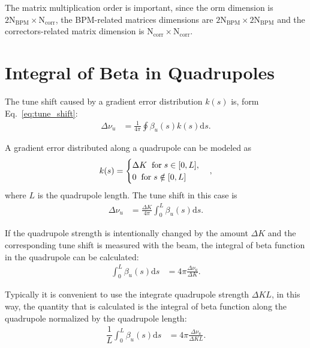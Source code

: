 The matrix multiplication order is important, since the \gls{orm} dimension is $2\mathrm{N}_{\mathrm{BPM}} \times \mathrm{N}_{\mathrm{corr}}$, the BPM-related matrices dimensions are $2\mathrm{N}_{\mathrm{BPM}} \times 2\mathrm{N}_{\mathrm{BPM}}$ and the correctors-related matrix dimension is $\mathrm{N}_{\mathrm{corr}} \times \mathrm{N}_{\mathrm{corr}}$. 

\chapter{Integral of Beta in Quadrupoles}
The tune shift caused by a gradient error distribution $k(s)$ is, form Eq.~\eqref{eq:tune_shift}:
\begin{align}
    \Delta\nu_u &= \frac{1}{4\pi} \oint \beta_u(s) k(s) \mathrm{d}s.
\end{align}

A gradient error distributed along a quadrupole can be modeled as
\begin{equation}
    k(s) = 
\begin{cases}
\Delta K \hspace{0.2cm} \text{for} \hspace{0.1cm} s \in [0, L], \\
0 \hspace{0.2cm} \text{for} \hspace{0.1cm} s \notin [0, L]
\end{cases},
\end{equation}
where $L$ is the quadrupole length. The tune shift in this case is
\begin{align}
    \Delta\nu_u &= \frac{\Delta K}{4\pi} \int_{0}^{L} \beta_u(s)\mathrm{d}s.
\end{align}

If the quadrupole strength is intentionally changed by the amount $\Delta K$ and the corresponding tune shift is measured with the beam, the integral of beta function in the quadrupole can be calculated:
\begin{align}
\int_{0}^{L} \beta_u(s) \mathrm{d}s &= 4\pi\frac{\Delta \nu_u}{\Delta K}.
\end{align}

Typically it is convenient to use the integrate quadrupole strength $\Delta KL$, in this way, the quantity that is calculated is the integral of beta function along the quadrupole normalized by the quadrupole length:
\begin{align}
\dfrac{1}{L}\int_{0}^{L} \beta_u(s) \mathrm{d}s &= 4\pi\frac{\Delta \nu_u}{\Delta KL}.
\end{align}

